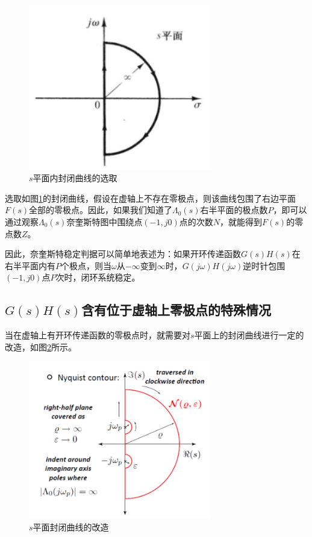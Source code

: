 \begin{figure}[!ht]
    \centering
    \includegraphics[width=8cm]{figures/25.png}
    \caption{$s$平面内封闭曲线的选取}
    \label{25}
\end{figure}

选取如图\ref{25}的封闭曲线，假设在虚轴上不存在零极点，则该曲线包围了右边平面$F(s)$全部的零极点。因此，如果我们知道了$\Lambda_0(s)$右半平面的极点数$P$，即可以通过观察$\Lambda_0(s)$奈奎斯特图中围绕点$(-1,j0)$点的次数$N$，就能得到$F(s)$的零点数$Z$。

因此，奈奎斯特稳定判据可以简单地表述为：如果开环传递函数$G(s)H(s)$在右半平面内有$P$个极点，则当$\omega$从$-\infty$变到$\infty$时，$G(j\omega)H(j\omega)$逆时针包围$(-1,j0)$点$P$次时，闭环系统稳定。

\subsection{$G(s)H(s)$含有位于虚轴上零极点的特殊情况}

当在虚轴上有开环传递函数的零极点时，就需要对$s$平面上的封闭曲线进行一定的改造，如图\ref{26}所示。

\begin{figure}[!ht]
    \centering
    \includegraphics[width=8cm]{figures/26.png}
    \caption{$s$平面封闭曲线的改造}
    \label{26}
\end{figure}

